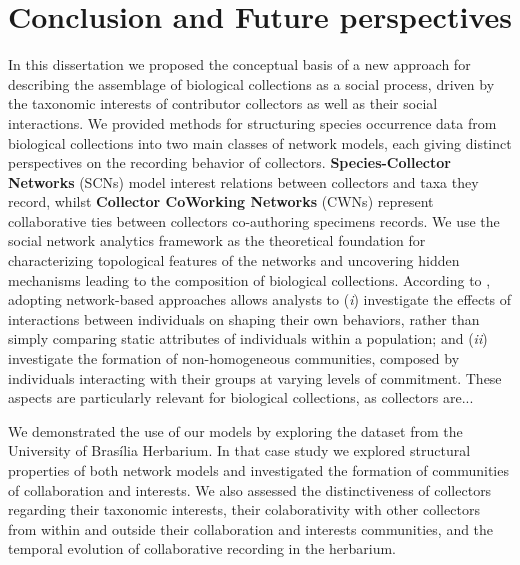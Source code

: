 \chapter{Conclusion and Future perspectives}\label{conclusion_perspectives}


In this dissertation we proposed the conceptual basis of a new approach for describing the assemblage of biological collections as a social process, driven by the taxonomic interests of contributor collectors as well as their social interactions.
We provided methods for structuring species occurrence data from biological collections into two main classes of network models, each giving distinct perspectives on the recording behavior of collectors.
\textbf{Species-Collector Networks} (SCNs) model interest relations between collectors and taxa they record, whilst \textbf{Collector CoWorking Networks} (CWNs) represent collaborative ties between collectors co-authoring specimens records. 
We use the social network analytics framework \cite{Barbier2011, Stork2015} as the theoretical foundation for characterizing topological features of the networks and uncovering hidden mechanisms leading to the composition of biological collections.
%
According to \cite*{Marin2011}, adopting network-based approaches allows analysts to
(\textit{i}) investigate the effects of interactions between individuals on shaping their own behaviors, rather than simply comparing static attributes of individuals within a population; and
(\textit{ii}) investigate the formation of non-homogeneous communities, composed by individuals interacting with their groups at varying levels of commitment.
These aspects are particularly relevant for biological collections, as collectors are...

We demonstrated the use of our models by exploring the dataset from the University of Brasília Herbarium.
In that case study we explored structural properties of both network models and investigated the formation of communities of collaboration and interests.
We also assessed the distinctiveness of collectors regarding their taxonomic interests, their colaborativity with other collectors from within and outside their collaboration and interests communities, and the temporal evolution of collaborative recording in the herbarium.


